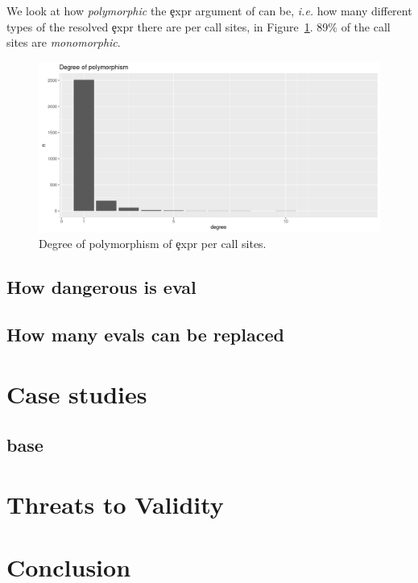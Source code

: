 \documentclass[conference]{IEEEtran}
\begin{document}
We look at how \emph{polymorphic} the \c{expr} argument of \eval can be, \emph{i.e.} how many different types of the resolved \c{expr} there are per call sites, in Figure~\ref{fig:polymorphism}. 89\% of the call sites are \emph{monomorphic}.

\begin{figure}
    \includegraphics[width=\columnwidth]{polymorphism-1}
    \caption{Degree of polymorphism of \c{expr} per call sites.} \label{fig:polymorphism}
\end{figure}

\subsection{How dangerous is eval}

\subsection{How many evals can be replaced}

\section{Case studies}

\subsection{base}

\section{Threats to Validity}

\section{Conclusion}



\end{document}
